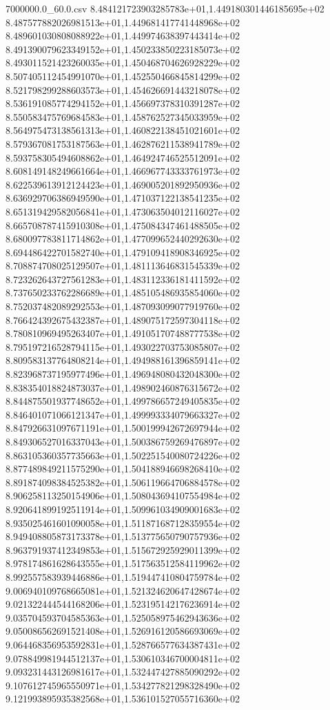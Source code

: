 \begin{filecontents*}{7000000.0_60.0.csv}
8.484121723903285783e+01,1.449180301446185695e+02
8.487577882026981513e+01,1.449681417741448968e+02
8.489601030808088922e+01,1.449974638397443414e+02
8.491390079623349152e+01,1.450233850223185073e+02
8.493011521423260035e+01,1.450468704626928229e+02
8.507405112454991070e+01,1.452550466845814299e+02
8.521798299288603573e+01,1.454626691443218078e+02
8.536191085774294152e+01,1.456697378310391287e+02
8.550583475769684583e+01,1.458762527345033959e+02
8.564975473138561313e+01,1.460822138451021601e+02
8.579367081753187563e+01,1.462876211538941789e+02
8.593758305494608862e+01,1.464924746525512091e+02
8.608149148249661664e+01,1.466967743333761973e+02
8.622539613912124423e+01,1.469005201892950936e+02
8.636929706386949590e+01,1.471037122138541235e+02
8.651319429582056841e+01,1.473063504012116027e+02
8.665708787415910308e+01,1.475084347461488505e+02
8.680097783811714862e+01,1.477099652440292630e+02
8.694486422701582740e+01,1.479109418908346925e+02
8.708874708025129507e+01,1.481113646831545339e+02
8.723262643727561283e+01,1.483112336181411592e+02
8.737650233762286689e+01,1.485105486935854060e+02
8.752037482089292553e+01,1.487093099077919760e+02
8.766424392675432387e+01,1.489075172597304118e+02
8.780810969495263407e+01,1.491051707488777538e+02
8.795197216528794115e+01,1.493022703753085807e+02
8.809583137764808214e+01,1.494988161396859141e+02
8.823968737195977496e+01,1.496948080432048300e+02
8.838354018824873037e+01,1.498902460876315672e+02
8.844875501937748652e+01,1.499786657249405835e+02
8.846401071066121347e+01,1.499993334079663327e+02
8.847926631097671191e+01,1.500199942672697944e+02
8.849306527016337043e+01,1.500386759269476897e+02
8.863105360357735663e+01,1.502251540080724226e+02
8.877489849211575290e+01,1.504188946698268410e+02
8.891874098384525382e+01,1.506119664706884578e+02
8.906258113250154906e+01,1.508043694107554984e+02
8.920641899192511914e+01,1.509961034909001683e+02
8.935025461601090058e+01,1.511871687128359554e+02
8.949408805873173378e+01,1.513775650790757936e+02
8.963791937412349853e+01,1.515672925929011399e+02
8.978174861628643555e+01,1.517563512584119962e+02
8.992557583939446886e+01,1.519447410804759784e+02
9.006940109768665081e+01,1.521324620647428674e+02
9.021322444544168206e+01,1.523195142176236914e+02
9.035704593704585363e+01,1.525058975462943636e+02
9.050086562691521408e+01,1.526916120586693069e+02
9.064468356953592831e+01,1.528766577634387431e+02
9.078849981944512137e+01,1.530610346700004811e+02
9.093231443126981617e+01,1.532447427885090292e+02
9.107612745965550971e+01,1.534277821298328490e+02
9.121993895935382568e+01,1.536101527055716360e+02

\end{filecontents*}
